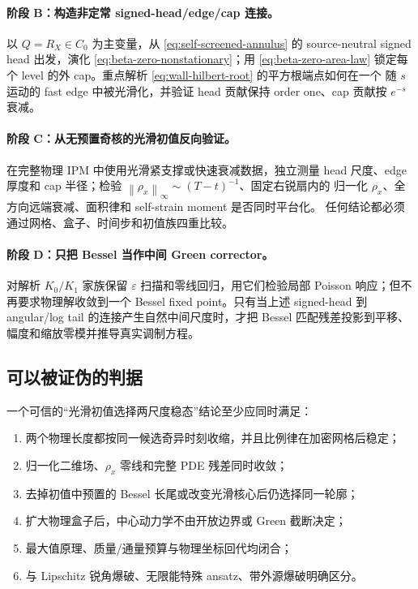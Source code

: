 \documentclass[11pt,a4paper,fontset=fandol]{ctexart}
\newcommand{\norm}[1]{\left\lVert #1\right\rVert}
\begin{document}
\paragraph{阶段 B：构造非定常 signed-head/edge/cap 连接。}
以 $Q=R_X\in C_0$ 为主变量，从
\eqref{eq:self-screened-annulus} 的 source-neutral signed head 出发，演化
\eqref{eq:beta-zero-nonstationary}；用 \eqref{eq:beta-zero-area-law} 锁定每个
level 的外 cap。重点解析 \eqref{eq:wall-hilbert-root} 的平方根端点如何在一个
随 $s$ 运动的 fast edge 中被光滑化，并验证 head 贡献保持 order one、cap
贡献按 $e^{-s}$ 衰减。

\paragraph{阶段 C：从无预置奇核的光滑初值反向验证。}
在完整物理 IPM 中使用光滑紧支撑或快速衰减数据，独立测量 head 尺度、edge
厚度和 cap 半径；检验 $\norm{\rho_x}_\infty\sim(T-t)^{-1}$、固定右锐扇内的
归一化 $\rho_x$、全方向远端衰减、面积律和 self-strain moment 是否同时平台化。
任何结论都必须通过网格、盒子、时间步和初值族四重比较。

\paragraph{阶段 D：只把 Bessel 当作中间 Green corrector。}
对解析 $K_0/K_1$ 家族保留 $\varepsilon$ 扫描和零线回归，用它们检验局部
Poisson 响应；但不再要求物理解收敛到一个 Bessel fixed point。只有当上述
signed-head 到 angular/log tail 的连接产生自然中间尺度时，才把 Bessel
匹配残差投影到平移、幅度和缩放零模并推导真实调制方程。

\subsection{可以被证伪的判据}

一个可信的“光滑初值选择两尺度稳态”结论至少应同时满足：
\begin{enumerate}
  \item 两个物理长度都按同一候选奇异时刻收缩，并且比例律在加密网格后稳定；
  \item 归一化二维场、$\rho_x$ 零线和完整 PDE 残差同时收敛；
  \item 去掉初值中预置的 Bessel 长尾或改变光滑核心后仍选择同一轮廓；
  \item 扩大物理盒子后，中心动力学不由开放边界或 Green 截断决定；
  \item 最大值原理、质量/通量预算与物理坐标回代均闭合；
  \item 与 Lipschitz 锐角爆破、无限能特殊 ansatz、带外源爆破明确区分。
\end{enumerate}
\end{document}

